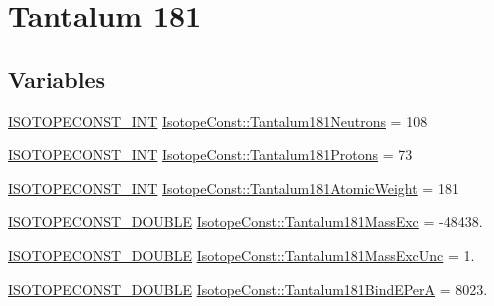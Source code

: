 \hypertarget{group___isotope_const-_tantalum-_ta181}{}\section{Tantalum 181}
\label{group___isotope_const-_tantalum-_ta181}
\subsection*{Variables}
\begin{DoxyCompactItemize}
\item 
\mbox{\hyperlink{group___isotope_const-_macros_ga5f18360b3e99483a35c32d789e62621c}{I\+S\+O\+T\+O\+P\+E\+C\+O\+N\+S\+T\+\_\+\+I\+NT}} \mbox{\hyperlink{group___isotope_const-_tantalum-_ta181_ga42e4811a360e3d1e5b5613f8df68c957}{Isotope\+Const\+::\+Tantalum181\+Neutrons}} = 108
\item 
\mbox{\hyperlink{group___isotope_const-_macros_ga5f18360b3e99483a35c32d789e62621c}{I\+S\+O\+T\+O\+P\+E\+C\+O\+N\+S\+T\+\_\+\+I\+NT}} \mbox{\hyperlink{group___isotope_const-_tantalum-_ta181_gaab8702fc1d176e7bee902aa9560af53f}{Isotope\+Const\+::\+Tantalum181\+Protons}} = 73
\item 
\mbox{\hyperlink{group___isotope_const-_macros_ga5f18360b3e99483a35c32d789e62621c}{I\+S\+O\+T\+O\+P\+E\+C\+O\+N\+S\+T\+\_\+\+I\+NT}} \mbox{\hyperlink{group___isotope_const-_tantalum-_ta181_ga3f02affff03bfbbf90a4f160edc06dd0}{Isotope\+Const\+::\+Tantalum181\+Atomic\+Weight}} = 181
\item 
\mbox{\hyperlink{group___isotope_const-_macros_ga8f45a7272ce02c0b4c65c44636ed719a}{I\+S\+O\+T\+O\+P\+E\+C\+O\+N\+S\+T\+\_\+\+D\+O\+U\+B\+LE}} \mbox{\hyperlink{group___isotope_const-_tantalum-_ta181_gae1c363d9fd5b6516c1a15520a26a6d9d}{Isotope\+Const\+::\+Tantalum181\+Mass\+Exc}} = -\/48438.
\item 
\mbox{\hyperlink{group___isotope_const-_macros_ga8f45a7272ce02c0b4c65c44636ed719a}{I\+S\+O\+T\+O\+P\+E\+C\+O\+N\+S\+T\+\_\+\+D\+O\+U\+B\+LE}} \mbox{\hyperlink{group___isotope_const-_tantalum-_ta181_gab59359d8304c10020c2dc45fe3f522fa}{Isotope\+Const\+::\+Tantalum181\+Mass\+Exc\+Unc}} = 1.
\item 
\mbox{\hyperlink{group___isotope_const-_macros_ga8f45a7272ce02c0b4c65c44636ed719a}{I\+S\+O\+T\+O\+P\+E\+C\+O\+N\+S\+T\+\_\+\+D\+O\+U\+B\+LE}} \mbox{\hyperlink{group___isotope_const-_tantalum-_ta181_ga270f198de44655662e484b01341f9d29}{Isotope\+Const\+::\+Tantalum181\+Bind\+E\+PerA}} = 8023.
\item 

\end{DoxyCompactItemize}
